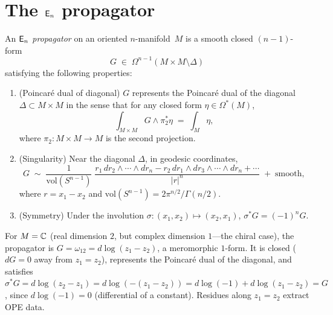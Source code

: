 \section{\texorpdfstring{The $\mathsf{E}_n$ propagator}{The En propagator}}
\label{sec:en-propagator}

\begin{definition}
\label{def:en-propagator}
An \emph{$\mathsf{E}_n$ propagator} on an oriented $n$-manifold~$M$ is a
smooth closed $(n-1)$-form
\[
G \;\in\; \Omega^{n-1}(M \times M \setminus \Delta)
\]
satisfying the following properties:
\begin{enumerate}[label=\textup{(\roman*)}]
\item \textup{(Poincar\'e dual of diagonal)}\quad
  $G$ represents the Poincar\'e dual of the diagonal
  $\Delta \subset M \times M$ in the sense that for any
  closed form $\eta \in \Omega^*(M)$,
  \[
  \int_{M \times M} G \wedge \pi_2^* \eta
  \;=\; \int_M \eta,
  \]
  where $\pi_2\colon M \times M \to M$ is the second projection.
\item \textup{(Singularity)}\quad
  Near the diagonal $\Delta$, in geodesic coordinates,
  \[
  G \;\sim\;
  \frac{1}{\mathrm{vol}(S^{n-1})}\;
  \frac{r_1\, dr_2 \wedge \cdots \wedge dr_n
  - r_2\, dr_1 \wedge dr_3 \wedge \cdots \wedge dr_n
  + \cdots}{|r|^n}
  \;+\; \text{smooth},
  \]
  where $r = x_1 - x_2$ and $\mathrm{vol}(S^{n-1}) = 2\pi^{n/2}/\Gamma(n/2)$.
\item \textup{(Symmetry)}\quad
  Under the involution $\sigma\colon (x_1, x_2) \mapsto (x_2, x_1)$,
  $\sigma^* G = (-1)^n G$.
\end{enumerate}
\end{definition}

\begin{example}[\texorpdfstring{$n = 2$}{n = 2}: the chiral propagator on a complex curve]
\label{ex:n2-chiral-propagator}
For $M = \mathbb{C}$ (real dimension $2$, but complex dimension $1$---the
chiral case), the propagator is
$G = \omega_{12} = d\log(z_1 - z_2)$, a meromorphic $1$-form.
It is closed ($dG = 0$ away from $z_1 = z_2$), represents the
Poincar\'e dual of the diagonal, and satisfies
$\sigma^* G = d\log(z_2 - z_1) = d\log(-(z_1-z_2)) = d\log(-1) + d\log(z_1-z_2) = G$,
since $d\log(-1) = 0$ (differential of a constant).  Residues along $z_1 = z_2$ extract OPE data.
\end{example}

